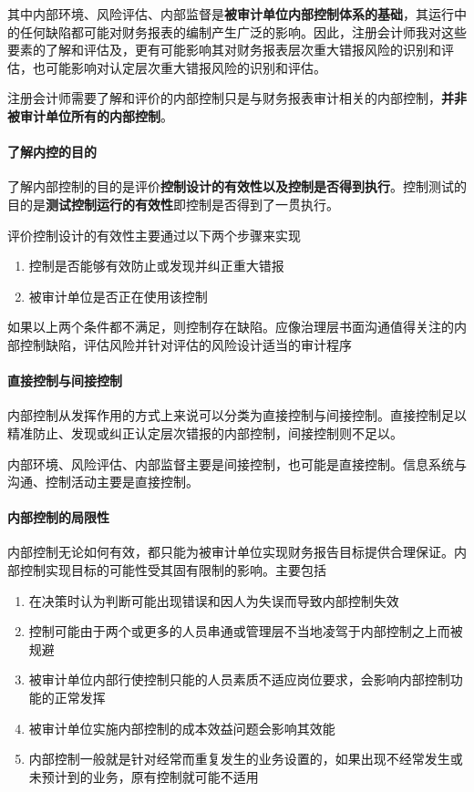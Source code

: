 \documentclass[UTF8,12pt]{ctexart}
\numberwithin{equation}{section} %
\numberwithin{figure}{section}
\numberwithin{table}{section}
\begin{document}
	其中内部环境、风险评估、内部监督是\textbf{被审计单位内部控制体系的基础}，其运行中的任何缺陷都可能对财务报表的编制产生广泛的影响。因此，注册会计师我对这些要素的了解和评估及，更有可能影响其对财务报表层次重大错报风险的识别和评估，也可能影响对认定层次重大错报风险的识别和评估。
	
	注册会计师需要了解和评价的内部控制只是与财务报表审计相关的内部控制，\textbf{并非被审计单位所有的内部控制}。
	
	\paragraph{了解内控的目的}了解内部控制的目的是评价\textbf{控制设计的有效性以及控制是否得到执行}。控制测试的目的是\textbf{测试控制运行的有效性}即控制是否得到了一贯执行。
	
	评价控制设计的有效性主要通过以下两个步骤来实现
	\begin{enumerate}
		\item 控制是否能够有效防止或发现并纠正重大错报
		
		\item 被审计单位是否正在使用该控制
	\end{enumerate}
	
	如果以上两个条件都不满足，则控制存在缺陷。应像治理层书面沟通值得关注的内部控制缺陷，评估风险并针对评估的风险设计适当的审计程序
	
	\paragraph{直接控制与间接控制}内部控制从发挥作用的方式上来说可以分类为直接控制与间接控制。直接控制足以精准防止、发现或纠正认定层次错报的内部控制，间接控制则不足以。
	
	内部环境、风险评估、内部监督主要是间接控制，也可能是直接控制。信息系统与沟通、控制活动主要是直接控制。
	
	\paragraph{内部控制的局限性} 内部控制无论如何有效，都只能为被审计单位实现财务报告目标提供合理保证。内部控制实现目标的可能性受其固有限制的影响。主要包括
	\begin{enumerate}
		\item 在决策时认为判断可能出现错误和因人为失误而导致内部控制失效
		
		\item 控制可能由于两个或更多的人员串通或管理层不当地凌驾于内部控制之上而被规避
		
		\item 被审计单位内部行使控制只能的人员素质不适应岗位要求，会影响内部控制功能的正常发挥
		
		\item 被审计单位实施内部控制的成本效益问题会影响其效能
		
		\item 内部控制一般就是针对经常而重复发生的业务设置的，如果出现不经常发生或未预计到的业务，原有控制就可能不适用
	\end{enumerate}
	
\end{document}
